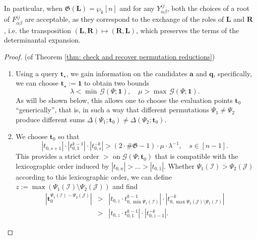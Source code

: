 \documentclass[10pt]{article}
\theoremstyle{remark}%
\theoremstyle{definition}%
\begin{document}
In particular, when $\mathfrak{G}(\mathbf{L})=\wp_{k}[n]$ and for any $Y_{\alpha\beta}^{ij}$, both the choices of a root of $F_{\alpha\beta}^{ij}$ are acceptable, as they correspond to the exchange of the roles of $\mathbf{L}$ and $\mathbf{R}$, i.e. the transposition $(\mathbf{L},\mathbf{R})\mapsto (\mathbf{R},\mathbf{L})$, which preserves the terms of the determinantal expansion. 


\begin{proof}{(of Theorem \ref{thm: check and recover permutation reductions})} 
\begin{enumerate} 
\item Using a query $\mathbf{t}_{\star}$, we gain information on the candidates $\mathbf{a}$ and $\mathbf{q}$, specifically, we can choose $\mathbf{t}_{\star}:=\mathbf{1}$ to obtain two bounds 
\begin{equation} 
\lambda < \min\,\mathcal{G}(\Psi;\mathbf{1}),
\quad \mu > \max\,\mathcal{G}(\Psi;\mathbf{1}).
\label{eq: upper bound for structural matrix} 
\end{equation}
As will be shown below, this allows one to choose the evaluation points $\mathbf{t}_{0}$ ``generically'', that is, in such a way that different permutations $\Psi_{1}\neq\Psi_{2}$ produce different sums $\Delta(\Psi_{1};\mathbf{t}_{0})\neq\Delta(\Psi_{2};\mathbf{t}_{0})$.   
\item We choose $\mathbf{t}_{0}$ so that 
\begin{equation}
\left|t_{0,s+1}\right|\cdot\left|t_{0,1}^{k-1}\right|\cdot\left|t_{0,s}^{-k}\right| > (2\cdot\#\mathfrak{G}-1)\cdot \mu\cdot\lambda^{-1},\quad s\in [n-1].
\label{eq: ordering of variables for labelling}
\end{equation} 
This provides a strict order $>$ on $\mathcal{G}(\Psi;\mathbf{t}_{0})$
that is compatible with the lexicographic order induced by $|t_{0,n}| > \dots > |t_{0,1}|$. Whether $\Psi_{1}(\mathcal{I})>\Psi_{2}(\mathcal{J})$ according to this lexicographic order, we can define $z:=\max(\Psi_{1}(\mathcal{I})\setminus\Psi_{2}(\mathcal{J}))$ and find 
\begin{eqnarray}
\left|\mathbf{t}_{0}^{\Psi_{1}(\mathcal{I})-\Psi_{2}(\mathcal{J})}\right|& > & \left|t_{0,z}\cdot t_{0,\min\Psi_{1}(\mathcal{I})}^{k-1}\right|\cdot\left|t_{0,\max\Psi_{2}(\mathcal{J})\setminus\Psi_{1}(\mathcal{I})}^{-k}\right|\nonumber \\
& > & \left|t_{0,z}\cdot t_{0,1}^{k-1}\right|\cdot\left|t_{0,z-1}^{-k}\right|.

\end{eqnarray}
\end{enumerate}
\end{proof}
\end{document}
